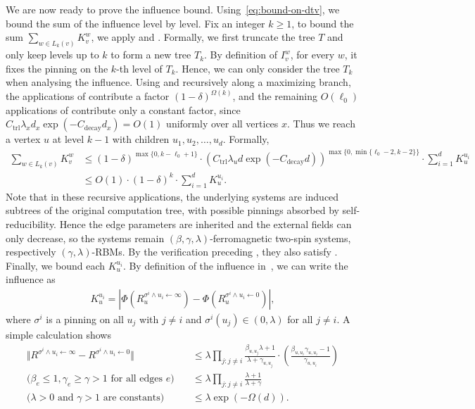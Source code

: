 \documentclass[11pt]{amsart}
\newcommand{\tp}[1]{{\left( #1 \right)}}
\theoremstyle{definition}
\theoremstyle{remark}
\begin{document}
We are now ready to prove the influence bound. Using~\eqref{eq:bound-on-dtv}, we bound the sum of the influence level by level. Fix an integer $k \geq 1$, to bound the sum $\sum_{w \in L_k(v)} K_v^w$, we apply  and . Formally, we first truncate the tree $T$ and only keep levels up to $k$ to form a new tree $T_k$. By definition of $I_v^w$, for every $w$, it fixes the pinning on the $k$-th level of $T_k$. Hence, we can only consider the tree $T_k$ when analysing the influence. Using  and  recursively along a maximizing branch, the applications of  contribute a factor $(1-\delta)^{\Omega(k)}$, and the remaining $O(\ell_0)$ applications of  contribute only a constant factor, since $C_\text{trl}\lambda_x d_x\exp(-C_{\text{decay}}d_x)=O(1)$ uniformly over all vertices $x$. Thus we reach a vertex $u$ at level $k-1$ with children $u_1,u_2,\ldots,u_d$. Formally,
\begin{align*}
    \sum_{w \in L_k(v)} K_v^w &\leq (1-\delta)^{\max\{0,k-\ell_0+1\}} \cdot \tp{C_\text{trl} \lambda_u d \exp(-C_{\text{decay}}d)}^{\max\{0,\min\{\ell_0-2,k-2\}\}} \cdot \sum_{i=1}^d K_{u}^{u_i} \\
    &\leq O(1) \cdot (1 - \delta)^k \cdot \sum_{i=1}^d K_{u}^{u_i}.
\end{align*}
Note that in these recursive applications, the underlying systems are induced subtrees of the original computation tree, with possible pinnings absorbed by self-reducibility. Hence the edge parameters are inherited and the external fields can only decrease, so the systems remain $(\beta,\gamma,\lambda)$-ferromagnetic two-spin systems, respectively $(\gamma,\lambda)$-RBMs. By the verification preceding , they also satisfy .
Finally, we bound each $K_{u}^{u_i}$. By definition of the influence in~, we can write the influence as 
\begin{align*}
    K_{u}^{u_i} = \left\vert \Phi(R_u^{\sigma^i \land u_i \gets \infty}) - \Phi(R_u^{\sigma^i \land u_i \gets 0}) \right\vert,
\end{align*}
where $\sigma^i$ is a pinning on all $u_j$ with $j \neq i$ and $\sigma^i(u_j) \in (0,\lambda)$ for all $j \neq i$. A simple calculation shows 
\begin{align*}
\Vert R^{\sigma^i \land u_i \gets \infty} - R^{\sigma^i \land u_i \gets 0} \Vert &\leq \lambda \prod_{j: j\neq i}{\frac{\beta_{u,u_j} \lambda + 1}{\lambda + \gamma_{u,u_j}}} \cdot \tp{ \frac{\beta_{u,u_i}\gamma_{u,u_i} - 1}{\gamma_{u,u_i}}}\\
\text{($\beta_{e} \leq 1,\gamma_{e} \geq \gamma > 1$ for all edges $e$)}\quad&\leq \lambda \prod_{j: j\neq i}{\frac{ \lambda + 1}{\lambda + \gamma}} \\
\text{($\lambda > 0$ and $\gamma > 1$ are constants)}\quad &\leq \lambda \exp(-\Omega(d)).
\end{align*}
\end{document}
